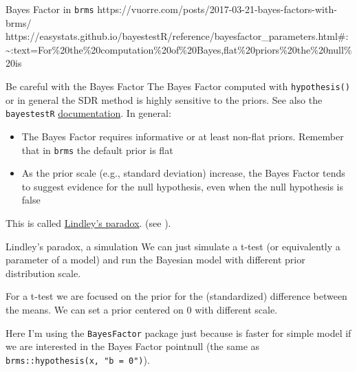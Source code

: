 \documentclass[
  ignorenonframetext,
]{beamer}
\providecommand{\tightlist}{%
  \setlength{\itemsep}{0pt}\setlength{\parskip}{0pt}}
\begin{document}
\begin{frame}{Bayes Factor in \texttt{brms}}
\label{bayes-factor-in-brms}
https://vuorre.com/posts/2017-03-21-bayes-factors-with-brms/
https://easystats.github.io/bayestestR/reference/bayesfactor\_parameters.html\#:\textasciitilde:text=For\%20the\%20computation\%20of\%20Bayes,flat\%20priors\%20the\%20null\%20is
\end{frame}

\begin{frame}[fragile]{Be careful with the Bayes Factor}
\label{be-careful-with-the-bayes-factor}
The Bayes Factor computed with \texttt{hypothesis()} or in general the
SDR method is highly sensitive to the priors. See also the
\texttt{bayestestR}
\href{https://easystats.github.io/bayestestR/reference/bayesfactor_parameters.html\#setting-the-correct-prior}{documentation}.
In general:

\begin{itemize}
\tightlist
\item
  The Bayes Factor requires informative or at least non-flat priors.
  Remember that in \texttt{brms} the default prior is flat
\item
  As the prior scale (e.g., standard deviation) increase, the Bayes
  Factor tends to suggest evidence for the null hypothesis, even when
  the null hypothesis is false
\end{itemize}

This is called
\href{https://en.wikipedia.org/wiki/Lindley\%27s_paradox}{Lindley's
paradox}. (see ).
\end{frame}

\begin{frame}[fragile]{Lindley's paradox, a simulation}
\label{lindleys-paradox-a-simulation}
We can just simulate a t-test (or equivalently a parameter of a model)
and run the Bayesian model with different prior distribution scale.

For a t-test we are focused on the prior for the (standardized)
difference between the means. We can set a prior centered on 0 with
different scale.

Here I'm using the \texttt{BayesFactor} package just because is faster
for simple model if we are interested in the Bayes Factor pointnull (the
same as \texttt{brms::hypothesis(x,\ "b\ =\ 0")}).
\end{frame}
\end{document}
